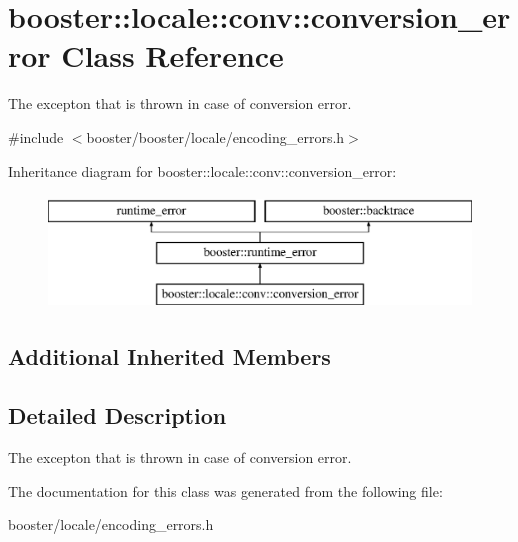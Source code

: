 \section{booster\-:\-:locale\-:\-:conv\-:\-:conversion\-\_\-error Class Reference}
\label{classbooster_1_1locale_1_1conv_1_1conversion__error}


The excepton that is thrown in case of conversion error.  




{\ttfamily \#include $<$booster/booster/locale/encoding\-\_\-errors.\-h$>$}

Inheritance diagram for booster\-:\-:locale\-:\-:conv\-:\-:conversion\-\_\-error\-:\begin{figure}[H]
\begin{center}
\leavevmode
\includegraphics[height=3.000000cm]{classbooster_1_1locale_1_1conv_1_1conversion__error}
\end{center}
\end{figure}
\subsection*{Additional Inherited Members}


\subsection{Detailed Description}
The excepton that is thrown in case of conversion error. 

The documentation for this class was generated from the following file\-:\begin{DoxyCompactItemize}
\item 
booster/locale/encoding\-\_\-errors.\-h\end{DoxyCompactItemize}

